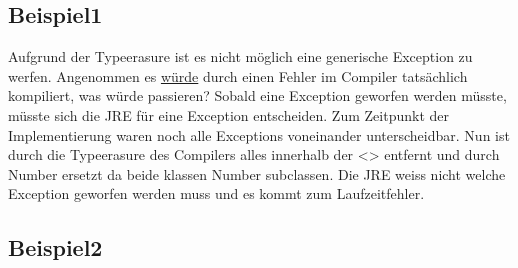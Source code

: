 \documentclass[12pt,a4paper,oneside,ngerman]{article}
\begin{document}
\subsection*{Beispiel1}
Aufgrund der Typeerasure ist es nicht möglich eine generische Exception zu werfen. Angenommen es \underline{würde}  durch einen Fehler im Compiler tatsächlich kompiliert, was würde passieren? Sobald eine Exception geworfen werden müsste, müsste sich die JRE für eine Exception entscheiden. Zum Zeitpunkt der Implementierung waren noch alle Exceptions voneinander unterscheidbar. Nun ist durch die Typeerasure des Compilers alles innerhalb der <> entfernt und durch Number ersetzt da beide klassen Number subclassen. Die JRE weiss nicht welche Exception geworfen werden muss und es kommt zum Laufzeitfehler.

\subsection*{Beispiel2}


\end{document}
